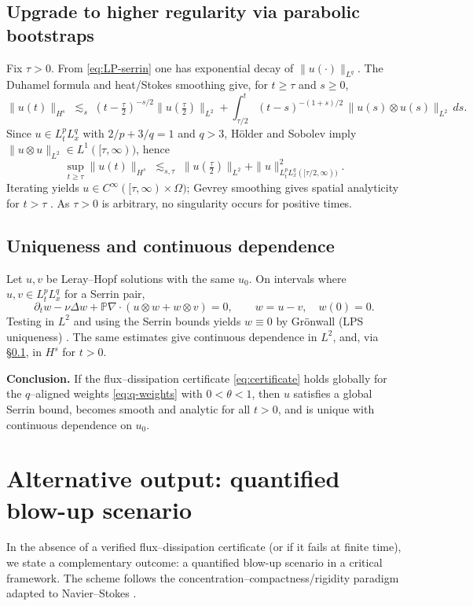 \IfFileExists{nyjm.cls}{\documentclass[11pt]{nyjm}}{\documentclass[11pt]{amsart}}
\theoremstyle{plain}
\theoremstyle{definition}
\theoremstyle{remark}
\begin{document}
\subsection{Upgrade to higher regularity via parabolic bootstraps}\label{subsec:bootstrap-regularity}
Fix $\tau>0$. From \eqref{eq:LP-serrin} one has exponential decay of $\|u(\cdot)\|_{L^q}$. The Duhamel formula and heat/Stokes smoothing give, for $t\ge\tau$ and $s\ge0$,
\[
\|u(t)\|_{H^s}
\;\lesssim_s\; (t-\tfrac{\tau}{2})^{-s/2}\|u(\tfrac{\tau}{2})\|_{L^2}
+\int_{\tau/2}^t (t-s)^{-(1+s)/2}\,\|u(s)\otimes u(s)\|_{L^2}\,ds.
\]
Since $u\in L^p_tL^q_x$ with $2/p+3/q=1$ and $q>3$, Hölder and Sobolev imply $\|u\otimes u\|_{L^2}\in L^1([\tau,\infty))$, hence
\[
\sup_{t\ge\tau}\|u(t)\|_{H^s}\;\lesssim_{s,\tau}\; \|u(\tfrac{\tau}{2})\|_{L^2}
+\|u\|_{L^p_tL^q_x([\tau/2,\infty))}^2.
\]
Iterating yields $u\in C^\infty([\tau,\infty)\times\Omega)$; Gevrey smoothing gives spatial analyticity for $t>\tau$ \cite{ConstantinFoias1988,Temam2001}. As $\tau>0$ is arbitrary, no singularity occurs for positive times.

\subsection{Uniqueness and continuous dependence}\label{subsec:bootstrap-uniq}
Let $u,v$ be Leray–Hopf solutions with the same $u_0$. On intervals where $u,v\in L^p_tL^q_x$ for a Serrin pair,
\[
\partial_t w-\nu\Delta w+\mathbb P\nabla\!\cdot(u\otimes w+w\otimes v)=0,\qquad w=u-v,\quad w(0)=0.
\]
Testing in $L^2$ and using the Serrin bounds yields $w\equiv0$ by Grönwall (LPS uniqueness) \cite{Serrin1963,Temam2001,ConstantinFoias1988}. The same estimates give continuous dependence in $L^2$, and, via \S\ref{subsec:bootstrap-regularity}, in $H^s$ for $t>0$.

\medskip
\noindent\textbf{Conclusion.}
If the flux–dissipation certificate \eqref{eq:certificate} holds globally for the $q$–aligned weights \eqref{eq:q-weights} with $0<\theta<1$, then $u$ satisfies a global Serrin bound, becomes smooth and analytic for all $t>0$, and is unique with continuous dependence on $u_0$.

\section{Alternative output: quantified blow-up scenario}\label{sec:blowup}

In the absence of a verified flux–dissipation certificate (or if it fails at finite time), we state a complementary outcome: a quantified blow-up scenario in a critical framework. The scheme follows the concentration–compactness/rigidity paradigm adapted to Navier–Stokes \cite{BahouriGerard1999,Gerard1998,KenigMerle2006,GallagherKochPlanchon2016,LemarieRieusset2002}.
\end{document}
